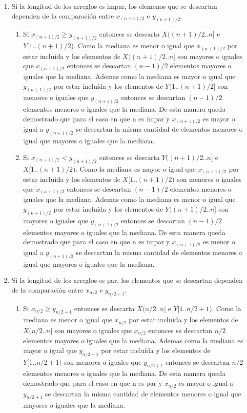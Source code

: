 \documentclass[a4paper,10pt] {article}
\begin{document}
\begin{enumerate}\item
Si la longitud de los arreglos es impar, los elemenos que se descartan dependen de la comparaci\'on entre $x_{(n+1)/2}$ e $y_{(n+1)/2}$.
\begin{enumerate}
\item
Si $x_{(n+1)/2} \geq y_{(n+1)/2}$ entonces se descarta $X((n+1)/2..n]$ e $Y[1..(n+1)/2)$. Como la mediana es menor o igual que $x_{(n+1)/2}$ por estar inclu\'ida y los elementos de $X((n+1)/2..n]$ son mayores o iguales que $x_{(n+1)/2}$ entonces se descartan $(n-1)/2$ elementos mayores o iguales que la mediana. Ademas como la mediana es mayor o igual que $y_{(n+1)/2}$ por estar inclu\'ida y los elementos de $Y(1..(n+1)/2]$ son menores o iguales que $y_{(n+1)/2}$ entonces se descartan $(n-1)/2$ elementos menores o iguales que la mediana. De esta manera queda demostrado que para el caso en que n es impar y $x_{(n+1)/2}$ es mayor o igual a $y_{(n+1)/2}$ se descartan la misma cantidad de elementos menores o igual que mayores o iguales que la mediana.

\item
Si $x_{(n+1)/2} < y_{(n+1)/2}$ entonces se descarta $Y((n+1)/2..n]$ e $X[1..(n+1)/2)$. Como la mediana es mayor o igual que $x_{(n+1)/2}$ por estar inclu\'ida y los elementos de $X[1..(n+1)/2)$ son menores o iguales que $x_{(n+1)/2}$ entonces se descartan $(n-1)/2$ elementos menores o iguales que la mediana. Ademas como la mediana es menor o igual que $y_{(n+1)/2}$ por estar inclu\'ida y los elementos de $Y((n+1)/2..n]$ son mayores o iguales que $y_{(n+1)/2}$ entonces se descartan $(n-1)/2$ elementos mayores o iguales que la mediana. De esta manera queda demostrado que para el caso en que n es impar y $x_{(n+1)/2}$ es menor o igual a $y_{(n+1)/2}$ se descartan la misma cantidad de elementos menores o igual que mayores o iguales que la mediana.
\end{enumerate}

\item
Si la longitud de los arreglos es par, los elementos que se descartan dependen de la comparaci\'on entre $x_{n/2}$ e $y_{n/2+1}$.  

\begin{enumerate}
\item
Si $x_{n/2} \geq y_{n/2+1}$ entonces se descarta $X(n/2..n]$ e $Y[1..n/2+1)$. Como la mediana es menor o igual que $x_{n/2}$ por estar inclu\'ida y los elementos de $X(n/2..n]$ son mayores o iguales que $x_{n/2}$ entonces se descartan $n/2$ elementos mayores o iguales que la mediana. Ademas como la mediana es mayor o igual que $y_{n/2+1}$ por estar inclu\'ida y los elementos de $Y[1..n/2+1)$ son menores o iguales que $y_{n/2+1}$ entonces se descartan $n/2$ elementos menores o iguales que la mediana. De esta manera queda demostrado que para el caso en que n es par y $x_{n/2}$ es mayor o igual a $y_{n/2+1}$ se descartan la misma cantidad de elementos menores o igual que mayores o iguales que la mediana.


\end{enumerate}
\end{enumerate}
\end{document}
